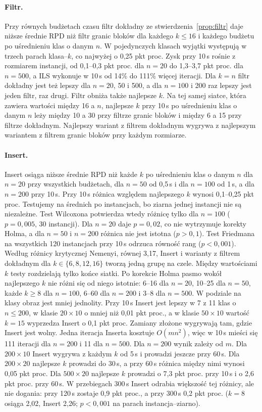 \documentclass[letterpaper]{article} %
\theoremstyle{definition}
\begin{document}
\paragraph{Filtr.} Przy równych budżetach czasu filtr dokładny ze
stwierdzenia~\ref{prop:filtr} daje niższe średnie RPD niż filtr granic
bloków dla każdego $k\leq 16$ i każdego budżetu po uśrednieniu klas o danym $n$. W pojedynczych klasach wyjątki występują w trzech parach klasa--$k$, co najwyżej o 0,25 pkt proc. Zysk przy
10\,s rośnie z rozmiarem instancji, od 0,1--0,3 pkt proc. dla $n=20$ do
1,3--3,7 pkt proc. dla $n=500$, a ILS wykonuje w 10\,s od 14\% do 111\%
więcej iteracji. Dla $k=n$ filtr dokładny jest też lepszy dla $n=20$, 50
i 500, a dla $n=100$ i 200 raz lepszy jest jeden filtr, raz drugi. Filtr
obniża także najlepsze $k$. Na tej samej siatce, która zawiera wartości
między 16 a $n$, najlepsze $k$ przy 10\,s po uśrednieniu klas o danym
$n$ leży między 10 a 30 przy filtrze granic bloków i między 6 a 15 przy
filtrze dokładnym. Najlepszy wariant z filtrem dokładnym wygrywa
z najlepszym wariantem z filtrem granic bloków przy każdym rozmiarze.

\paragraph{Insert.} Insert osiąga niższe średnie RPD niż każde $k$ po uśrednieniu klas o danym $n$ dla $n=20$ przy wszystkich budżetach, dla $n=50$ od 0,5\,s i dla $n=100$
od 1\,s, a dla $n=200$ przy 10\,s. Przy 10\,s różnica względem najlepszego $k$ wynosi 0,1--0,25
pkt proc. Testujemy na średnich po instancjach, bo ziarna jednej
instancji nie są niezależne. Test Wilcoxona potwierdza wtedy różnicę
tylko dla $n=100$ ($p=0{,}005$, 30 instancji). Dla $n=20$ daje
$p=0{,}02$, co nie wytrzymuje korekty Holma, a dla $n=50$ i $n=200$
różnica nie jest istotna ($p>0{,}1$). Test Friedmana na wszystkich 120
instancjach przy 10\,s odrzuca równość rang ($p<0{,}001$). Według
różnicy krytycznej Nemenyi, równej 3,17, Insert i warianty z filtrem
dokładnym dla $k\in\{6,8,12,16\}$ tworzą jedną grupę na czele. Między
wartościami $k$ testy rozdzielają tylko końce siatki. Po korekcie Holma
pasmo wokół najlepszego $k$ nie różni się od niego istotnie: 6--16 dla
$n=20$, 10--25 dla $n=50$, każde $k\geq 8$ dla $n=100$, 6--60 dla
$n=200$ i 3--8 dla $n=500$. W podziale
na klasy obraz jest mniej jednolity. Przy 10\,s Insert jest lepszy
w 7 z 11 klas o $n\leq 200$, w klasie $20\times 10$ o mniej niż 0,01 pkt
proc., a w klasie $50\times 10$ wartość $k=15$ wyprzedza Insert o 0,1 pkt
proc. Zamiany
złożone wygrywają tam, gdzie Insert jest wolny. Jedna iteracja Inserta
kosztuje $O(mn^2)$, więc w 10\,s mieści się 111 iteracji dla $n=200$ i 11 dla $n=500$. Dla $n=200$ wynik zależy od $m$. Dla $200\times 10$ Insert
wygrywa z każdym $k$ od 5\,s i prowadzi jeszcze przy 60\,s. Dla
$200\times 20$ najlepsze $k$ prowadzi do 30\,s, a przy 60\,s różnica między nimi wynosi 0,05 pkt proc. Dla $500\times 20$ najlepsze $k$ prowadzi o 7,3 pkt proc.
przy 10\,s i o 2,6 pkt proc. przy 60\,s. W przebiegach 300\,s Insert odrabia
większość tej różnicy, ale nie dogania: przy 120\,s zostaje 0,9 pkt proc.,
a przy 300\,s 0,2 pkt proc. ($k=8$ osiąga 2,02, Insert 2,26; $p<0{,}001$
na parach instancja--ziarno).
\end{document}
